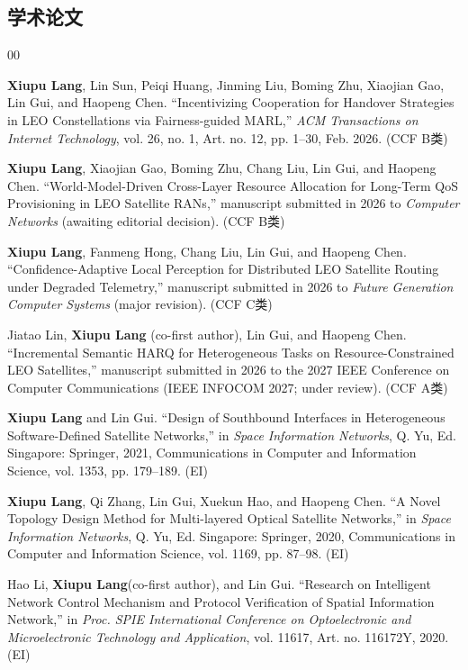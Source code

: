 
\begin{achievements}

\subsection*{学术论文}

\begin{bibliolist}{00}
  \item \textbf{Xiupu Lang}, Lin Sun, Peiqi Huang, Jinming Liu, Boming Zhu, Xiaojian Gao, Lin Gui, and Haopeng Chen. ``Incentivizing Cooperation for Handover Strategies in LEO Constellations via Fairness-guided MARL,'' \textit{ACM Transactions on Internet Technology}, vol. 26, no. 1, Art. no. 12, pp. 1--30, Feb. 2026. (CCF B类)
  \item \textbf{Xiupu Lang}, Xiaojian Gao, Boming Zhu, Chang Liu, Lin Gui, and Haopeng Chen. ``World-Model-Driven Cross-Layer Resource Allocation for Long-Term QoS Provisioning in LEO Satellite RANs,'' manuscript submitted in 2026 to \textit{Computer Networks} (awaiting editorial decision). (CCF B类)
  \item \textbf{Xiupu Lang}, Fanmeng Hong, Chang Liu, Lin Gui, and Haopeng Chen. ``Confidence-Adaptive Local Perception for Distributed LEO Satellite Routing under Degraded Telemetry,'' manuscript submitted in 2026 to \textit{Future Generation Computer Systems} (major revision). (CCF C类)
  \item Jiatao Lin, \textbf{Xiupu Lang} (co-first author), Lin Gui, and Haopeng Chen. ``Incremental Semantic HARQ for Heterogeneous Tasks on Resource-Constrained LEO Satellites,'' manuscript submitted in 2026 to the 2027 IEEE Conference on Computer Communications (IEEE INFOCOM 2027; under review). (CCF A类)
  \item \textbf{Xiupu Lang} and Lin Gui. ``Design of Southbound Interfaces in Heterogeneous Software-Defined Satellite Networks,'' in \textit{Space Information Networks}, Q. Yu, Ed. Singapore: Springer, 2021, Communications in Computer and Information Science, vol. 1353, pp. 179--189. (EI)
  \item \textbf{Xiupu Lang}, Qi Zhang, Lin Gui, Xuekun Hao, and Haopeng Chen. ``A Novel Topology Design Method for Multi-layered Optical Satellite Networks,'' in \textit{Space Information Networks}, Q. Yu, Ed. Singapore: Springer, 2020, Communications in Computer and Information Science, vol. 1169, pp. 87--98. (EI)
  \item Hao Li, \textbf{Xiupu Lang}(co-first author), and Lin Gui. ``Research on Intelligent Network Control Mechanism and Protocol Verification of Spatial Information Network,'' in \textit{Proc. SPIE International Conference on Optoelectronic and Microelectronic Technology and Application}, vol. 11617, Art. no. 116172Y, 2020. (EI)

\end{bibliolist}
\end{achievements}
